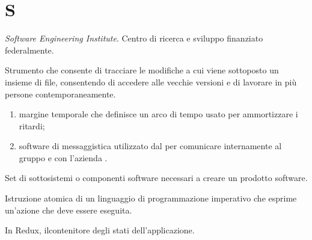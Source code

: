 \section{S}

\textit{Software Engineering Institute}. Centro di ricerca e sviluppo finanziato federalmente.


Strumento che consente di tracciare le modifiche a cui viene sottoposto un insieme di file, consentendo di accedere alle vecchie versioni e di lavorare in più persone contemporaneamente.

\begin{enumerate}
	\item margine temporale che definisce un arco di tempo usato per ammortizzare i ritardi;
	\item software di messaggistica utilizzato dal  \zephyrus{} per comunicare internamente al gruppo e con l'azienda \riskapp.
\end{enumerate}

Set di sottosistemi o componenti software necessari a creare un prodotto software.

Istruzione atomica di un linguaggio di programmazione imperativo che esprime un'azione che deve essere eseguita.

	In Redux, ilcontenitore degli stati dell'applicazione.
